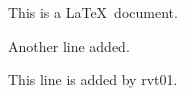 \documentclass{article}
\begin{document}
This is a \LaTeX\ document. 

Another line added.

This line is added by rvt01.
\end{document}
